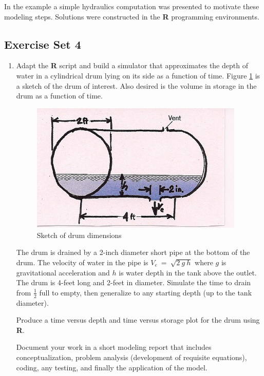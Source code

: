 In the example a simple hydraulics computation was presented to motivate these modeling steps.  
Solutions were constructed in the \textbf{R} programming environments.   

\subsection{Exercise Set 4}
\begin{enumerate}

\item Adapt the \textbf{R} script and build a simulator that approximates the depth of water in a cylindrical drum lying on its side as a function of time.  
Figure \ref{fig:drum} is a sketch of the drum of interest. 
Also desired is the volume in storage in the drum as a function of time.

\begin{figure}[h!] %
   \centering
   \includegraphics[width=4in]{./4-TankDrain/drum.jpg} 
   \caption{Sketch of drum dimensions}
   \label{fig:drum}
\end{figure}

The drum is drained by a 2-inch diameter short pipe at the bottom of the drum.  The velocity of water in the pipe is $V_e~=~\sqrt{2~g~h}$ where $g$ is gravitational acceleration and $h$ is water depth in the tank above the outlet.  The drum is 4-feet long and 2-feet in diameter.  Simulate the time to drain from $\frac{1}{2}$ full to empty, then generalize to any starting depth (up to the tank diameter).

Produce a time versus depth and time versus storage plot for the drum using \textbf{R}.  

Document your work in a short modeling report that includes conceptualization, problem analysis (development of requisite equations), coding, any testing, and finally the application of the model.  



\end{enumerate}
